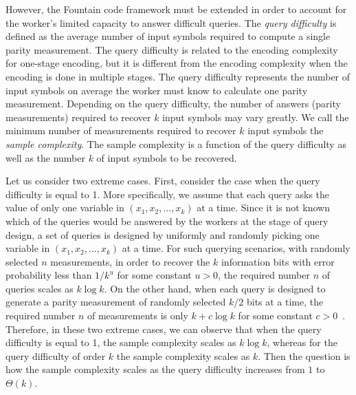 \documentclass[11pt,onecolumn]{IEEEtran}
\begin{document}
However, the Fountain code framework must be extended in order to account for the worker's limited capacity to answer difficult queries.  
The \emph{query difficulty} is defined as the average number of input symbols required to compute a single parity measurement. The query difficulty is related to the encoding complexity for one-stage encoding, but it is different from the encoding complexity when the encoding is done in multiple stages. The query difficulty represents the number of input symbols  on average the worker must know to calculate one parity measurement. 
Depending on the query difficulty, the number of answers (parity measurements) required to recover $k$ input symbols may vary greatly. We call the minimum number of measurements required to recover $k$ input symbols the \emph{sample complexity}. The sample complexity is a function of the query difficulty as well as the number $k$ of input symbols to be recovered. 


Let us consider two extreme cases. First, consider the case when the query difficulty is equal to 1. More specifically, we assume that each query asks the value of only one variable in $(x_1,x_2,\dots, x_k)$ at a time.
Since it is not known which of the queries would be answered by the workers at the stage of query design, a set of queries is designed by uniformly and randomly picking one variable in $(x_1,x_2,\dots, x_k)$ at a time.
For such querying scenarios, with randomly selected $n$ measurements, in order to recover the $k$ information bits with error probability less than $1/k^u$ for some constant $u>0$, the required number $n$ of queries scales as $k\log k$. On the other hand, when each query is designed to generate a parity measurement of randomly selected $k/2$ bits at a time, the required number $n$ of measurements is only $k+c\log k$ for some constant $c>0$~\cite{shokrollahi2006raptor}. Therefore, in these two extreme cases, we can observe that when the query difficulty is equal to 1, the sample complexity scales as $k\log k$, whereas for the query difficulty of order $k$ the sample complexity scales as $k$. Then the question is how the sample complexity scales as the query difficulty increases from $1$ to $\Theta(k)$.
\end{document}
